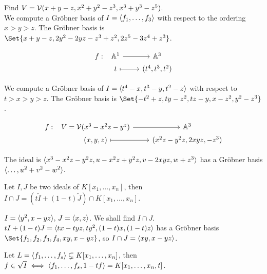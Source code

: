 \begin{example}
  Find $V = \mathcal{V}(x+y-z, x^2+y^2-z^3, x^3+y^3-z^5)$. \\
  We compute a Gr\"obner basis of $I = \langle f_1, \dots, f_3 \rangle$ with respect
  to the ordering $x > y > z$.
  The Gr\"obner basis is $\Set{x+y-z, 2y^2-2yz-z^3+z^2, 2z^5-3z^4+z^3}$.
\end{example}

\begin{example}
  \[
    \begin{tikzcd}[column sep=0.8cm,row sep=0ex]
      f: &[-0.7cm] \Ab^1 \arrow[r] & \Ab^3 \\
      & t \arrow[r, mapsto] & (t^4, t^3, t^2)
    \end{tikzcd}
  \]

  We compute a Gr\"obner basis of $I = \langle t^4 - x, t^3 - y, t^2 - z \rangle$ with
  respect to $t > x > y > z$. The Gr\"obner basis is
  $\Set{-t^2+z, ty-z^2, tz-y, x-z^2, y^2-z^3}$.
\end{example}

\begin{example}
  \[
    \begin{tikzcd}[column sep=0.8cm,row sep=0ex]
      f: &[-0.7cm] V = \Vc(x^3 - x^2z - y^z) \arrow[r] & \Ab^3 \\
      & (x, y, z) \arrow[r, mapsto] & (x^2 z - y^2 z, 2xyz, -z^3)
    \end{tikzcd}
  \]

  The ideal is $\langle x^3 - x^2 z - y^2 z, u - x^2 z + y^2 z, v - 2 x y z, w + z^3 \rangle$
    has a Gr\"obner basis $\langle \dots, u^2 + v^2 - w^2 \rangle$.
\end{example}

\begin{theorem}
  Let $I, J$ be two ideals of $K[x_1, \dots, x_n]$, then $I \cap J = (t \tilde{I} + (1 - t) \tilde{J}) \cap K[x_1, \dots, x_n]$.
\end{theorem}

\begin{example}
  $I = \langle y^2 , x - yz \rangle, \, J = \langle x, z \rangle$. We shall find $I \cap J$. \\
  $tI + (1-t)J = \langle tx - tyz, ty^2, (1-t)x, (1-t)z \rangle$ has a Gr\"obner basis
  $\Set{f_1, f_2, f_3, f_4, xy, x - yz}$, so $I \cap J = \langle xy, x-yz \rangle$.
\end{example}

\begin{theorem}
  Let $L = \langle f_1, \dots, f_s \rangle \subsetneq K[x_1, \dots, x_n]$, then
  $f \in \sqrt{I} \iff \langle f_1, \dots, f_s, 1 - tf \rangle = K[x_1, \dots, x_n, t]$.
\end{theorem}

